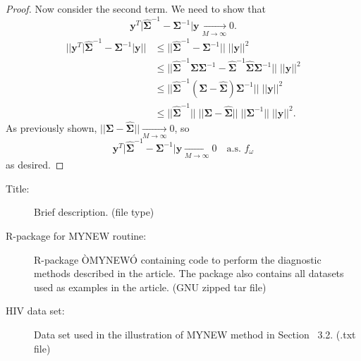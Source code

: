\documentclass[12pt]{article}
\begin{document}
\begin{proof}
Now consider the second term. We need to show that
\[
  \bm{y}^T \Big| \widehat{\bm{\Sigma}}^{-1} - \bm{\Sigma}^{-1} \Big| \bm{y} \xrightarrow[M \to \infty]{} 0.
\]
\begin{align*}
  \Big|\Big| \bm{y}^T \big| \widehat{\bm{\Sigma}}^{-1} - \bm{\Sigma}^{-1} \big| \bm{y} \Big|\Big| &\leq ||\widehat{\bm{\Sigma}}^{-1} - \bm{\Sigma}^{-1}|| \; ||\bm{y}||^2 \\
  &\leq || \widehat{\bm{\Sigma}}^{-1} \bm{\Sigma} \bm{\Sigma}^{-1} - \widehat{\bm{\Sigma}}^{-1} \widehat{\bm{\Sigma}} \bm{\Sigma}^{-1} || \; ||\bm{y}||^2 \\
  &\leq || \widehat{\bm{\Sigma}}^{-1} (\bm{\Sigma} - \widehat{\bm{\Sigma}}) \bm{\Sigma}^{-1} || \; ||\bm{y}||^2 \\
  &\leq || \widehat{\bm{\Sigma}}^{-1} || \; || \bm{\Sigma} - \widehat{\bm{\Sigma}} || \; || \bm{\Sigma}^{-1} || \; ||\bm{y}||^2.
\end{align*}
As previously shown, $|| \bm{\Sigma} - \widehat{\bm{\Sigma}} || \xrightarrow[M \to \infty]{} 0$, so
\[
  \bm{y}^T \Big| \widehat{\bm{\Sigma}}^{-1} - \bm{\Sigma}^{-1} \Big| \bm{y} \xrightarrow[M \to \infty]{} 0 \quad \textrm{a.s. } f_\omega
\]
as desired.

\end{proof}

\begin{description}

\item[Title:] Brief description. (file type)

\item[R-package for  MYNEW routine:] R-package ÒMYNEWÓ containing code to perform the diagnostic methods described in the article. The package also contains all datasets used as examples in the article. (GNU zipped tar file)

\item[HIV data set:] Data set used in the illustration of MYNEW method in Section~ 3.2. (.txt file)

\end{description}





\end{document}

